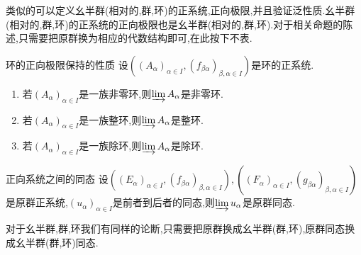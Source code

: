 \begin{remark}{}{}
	类似的可以定义幺半群(相对的,群,环)的正系统,正向极限,并且验证泛性质.幺半群(相对的,群,环)的正系统的正向极限也是幺半群(相对的,群,环).对于相关命题的陈述,只需要把原群换为相应的代数结构即可,在此按下不表.
\end{remark}

\begin{proposition}{环的正向极限保持的性质}{}
	设$\left(\left(A_{\alpha}\right)_{\alpha\in I},\left(f_{\beta\alpha}\right)_{\beta,\alpha\in I}\right)$是环的正系统.
	\begin{enumerate}
		\item 若$\left(A_{\alpha}\right)_{\alpha\in I}$是一族非零环,则$\varinjlim A_{\alpha}$是非零环.
		\item 若$\left(A_{\alpha}\right)_{\alpha\in I}$是一族整环,则$\varinjlim A_{\alpha}$是整环.
		\item 若$\left(A_{\alpha}\right)_{\alpha\in I}$是一族除环,则$\varinjlim A_{\alpha}$是除环.
	\end{enumerate}
\end{proposition}

\begin{proposition}{正向系统之间的同态}{}
	设$\left(\left(E_{\alpha}\right)_{\alpha\in I},\left(f_{\beta\alpha}\right)_{\beta,\alpha\in I}\right),\left(\left(F_{\alpha}\right)_{\alpha\in I},\left(g_{\beta\alpha}\right)_{\beta,\alpha\in I}\right)$是原群正系统,$\left(u_{\alpha}\right)_{\alpha\in I}$是前者到后者的同态,则$\varinjlim u_{\alpha}$是原群同态.	
\end{proposition}

\begin{remark}{}{}
	对于幺半群,群,环我们有同样的论断,只需要把原群换成幺半群(群,环),原群同态换成幺半群(群,环)同态.
\end{remark}





















































